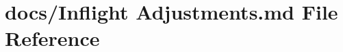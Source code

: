 \hypertarget{Inflight_01Adjustments_8md}{\section{docs/\+Inflight Adjustments.\+md File Reference}
\label{Inflight_01Adjustments_8md}
}
